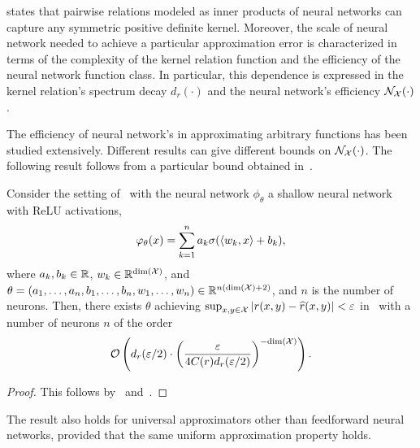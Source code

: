  states that pairwise relations modeled as inner products of neural networks can capture any symmetric positive definite kernel. Moreover, the scale of neural network needed to achieve a particular approximation error is characterized in terms of the complexity of the kernel relation function and the efficiency of the neural network function class. In particular, this dependence is expressed in the kernel relation's spectrum decay $d_r(\cdot)$ and the neural network's efficiency ${\mathcal{N}}_{\mathcal{X}}(\cdot)$.

The efficiency of neural network's in approximating arbitrary functions has been studied extensively. Different results can give different bounds on ${\mathcal{N}}_{\mathcal{X}}(\cdot)$. The following result follows from a particular bound obtained in~\parencite{poggioWhyWhenCan2017}.

\begin{corollary}
	Consider the setting of~ with the neural network $\phi_\theta$ a shallow neural network with ReLU activations,
	\begin{equation*}
		\phi_\theta(x) = \sum_{k=1}^{n} a_k \sigma(\iprod{w_k}{x} + b_k),
	\end{equation*}
	where $a_k, b_k \in \mathbb{R}$, $w_k \in \mathbb{R}^{\mathrm{dim}({\mathcal{X}})}$, and $\theta = (a_1, \ldots, a_n, b_1, \ldots, b_n, w_1, \ldots, w_n) \in \mathbb{R}^{n (\mathrm{dim}({\mathcal{X}}) + 2)}$, and $n$ is the number of neurons. Then, there exists $\theta$ achieving $\sup_{x,y \in \mathcal{X}}{\left\lvert r(x,y) - \widehat{r}(x,y)\right\rvert} < \varepsilon$ in~ with a number of neurons $n$ of the order 
	\[{\mathcal{O}}\left(d_r(\varepsilon / 2) \cdot \left(\frac{\varepsilon}{4 C(r) d_r(\varepsilon / 2)}\right)^{-\mathrm{dim}({\mathcal{X}})}\right).\]
\end{corollary}
\begin{proof}
	This follows by~ and~\parencite[Theorem 4]{poggioWhyWhenCan2017}.
\end{proof}


\begin{remark}
	The result also holds for universal approximators other than feedforward neural networks, provided that the same uniform approximation property holds.
\end{remark}